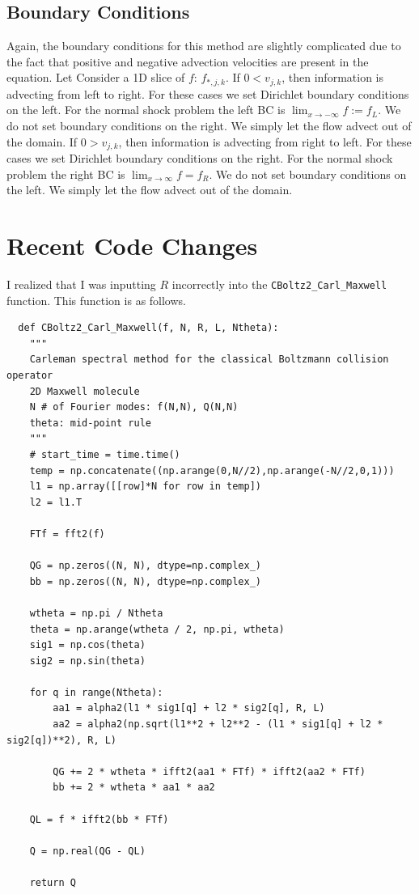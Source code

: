 \documentclass{article}
\begin{document}
\subsection{Boundary Conditions}
Again, the boundary conditions for this method are slightly complicated due to the fact that positive and negative advection velocities are present in the equation. Let Consider a 1D slice of $f$: $f_{*,j,k}$. If $0 < v_{j,k}$, then information is advecting from left to right. For these cases we set Dirichlet boundary conditions on the left. For the normal shock problem the left BC is $\lim_{x \to -\infty} f := f_L$. We do not set boundary conditions on the right. We simply let the flow advect out of the domain. If $0 > v_{j,k}$, then information is advecting from right to left. For these cases we set Dirichlet boundary conditions on the right. For the normal shock problem the right BC is $\lim_{x \to \infty} f = f_R$. We do not set boundary conditions on the left. We simply let the flow advect out of the domain.

\section{Recent Code Changes}
I realized that I was inputting $R$ incorrectly into the \verb|CBoltz2_Carl_Maxwell| function. This function is as follows.

\begin{lstlisting}
  def CBoltz2_Carl_Maxwell(f, N, R, L, Ntheta):
    """
    Carleman spectral method for the classical Boltzmann collision operator
    2D Maxwell molecule
    N # of Fourier modes: f(N,N), Q(N,N)
    theta: mid-point rule
    """
    # start_time = time.time()
    temp = np.concatenate((np.arange(0,N//2),np.arange(-N//2,0,1)))
    l1 = np.array([[row]*N for row in temp])
    l2 = l1.T
    
    FTf = fft2(f)

    QG = np.zeros((N, N), dtype=np.complex_)
    bb = np.zeros((N, N), dtype=np.complex_)

    wtheta = np.pi / Ntheta
    theta = np.arange(wtheta / 2, np.pi, wtheta)
    sig1 = np.cos(theta)
    sig2 = np.sin(theta)

    for q in range(Ntheta):
        aa1 = alpha2(l1 * sig1[q] + l2 * sig2[q], R, L)
        aa2 = alpha2(np.sqrt(l1**2 + l2**2 - (l1 * sig1[q] + l2 * sig2[q])**2), R, L)

        QG += 2 * wtheta * ifft2(aa1 * FTf) * ifft2(aa2 * FTf)
        bb += 2 * wtheta * aa1 * aa2

    QL = f * ifft2(bb * FTf)

    Q = np.real(QG - QL)

    return Q
\end{lstlisting}
\end{document}
